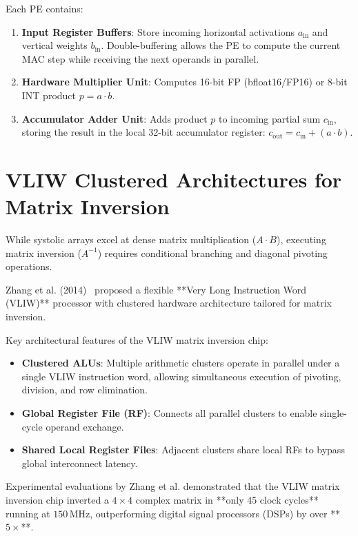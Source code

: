 Each PE contains:
\begin{enumerate}[leftmargin=*]
    \item \textbf{Input Register Buffers}: Store incoming horizontal activations $a_{\text{in}}$ and vertical weights $b_{\text{in}}$. Double-buffering allows the PE to compute the current MAC step while receiving the next operands in parallel.
    \item \textbf{Hardware Multiplier Unit}: Computes 16-bit FP (bfloat16/FP16) or 8-bit INT product $p = a \cdot b$.
    \item \textbf{Accumulator Adder Unit}: Adds product $p$ to incoming partial sum $c_{\text{in}}$, storing the result in the local 32-bit accumulator register: $c_{\text{out}} = c_{\text{in}} + (a \cdot b)$.
\end{enumerate}

\section{VLIW Clustered Architectures for Matrix Inversion}
While systolic arrays excel at dense matrix multiplication ($A \cdot B$), executing matrix inversion ($A^{-1}$) requires conditional branching and diagonal pivoting operations.

Zhang et al. (2014)~\cite{zhang2014efficient} proposed a flexible **Very Long Instruction Word (VLIW)** processor with clustered hardware architecture tailored for matrix inversion. 

Key architectural features of the VLIW matrix inversion chip:
\begin{itemize}[leftmargin=*]
    \item \textbf{Clustered ALUs}: Multiple arithmetic clusters operate in parallel under a single VLIW instruction word, allowing simultaneous execution of pivoting, division, and row elimination.
    \item \textbf{Global Register File (RF)}: Connects all parallel clusters to enable single-cycle operand exchange.
    \item \textbf{Shared Local Register Files}: Adjacent clusters share local RFs to bypass global interconnect latency.
\end{itemize}

Experimental evaluations by Zhang et al. demonstrated that the VLIW matrix inversion chip inverted a $4 \times 4$ complex matrix in **only 45 clock cycles** running at $150\,\text{MHz}$, outperforming digital signal processors (DSPs) by over **$5\times$**.

